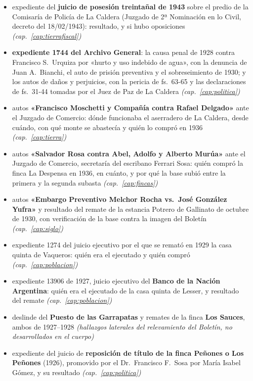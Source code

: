 \begin{itemize}[leftmargin=*]
\item expediente del \textbf{juicio de posesión treintañal de 1943} sobre el predio de la Comisaría de Policía de La Caldera (Juzgado de 2ª Nominación en lo Civil, decreto del 18/02/1943): resultado, y si hubo oposiciones \textit{(cap.\ \ref{cap:tierrafiscal})}
\item \textbf{expediente 1744 del Archivo General}: la causa penal de 1928 contra Francisco S.\ Urquiza por «hurto y uso indebido de agua», con la denuncia de Juan A.\ Bianchi, el auto de prisión preventiva y el sobreseimiento de 1930; y los autos de daños y perjuicios, con la pericia de fs.\ 63-65 y las declaraciones de fs.\ 31-44 tomadas por el Juez de Paz de La Caldera \textit{(cap.\ \ref{cap:politica})}
\item autos \textbf{«Francisco Moschetti y Compañía contra Rafael Delgado»} ante el Juzgado de Comercio: dónde funcionaba el aserradero de La Caldera, desde cuándo, con qué monte se abastecía y quién lo compró en 1936 \textit{(cap.\ \ref{cap:tierra})}
\item autos \textbf{«Salvador Rosa contra Abel, Adolfo y Alberto Murúa»} ante el Juzgado de Comercio, secretaría del escribano Ferrari Sosa: quién compró la finca La Despensa en 1936, en cuánto, y por qué la base subió entre la primera y la segunda subasta \textit{(cap.\ \ref{cap:fincas})}
\item autos \textbf{«Embargo Preventivo Melchor Rocha vs.\ José González Yufra»} y resultado del remate de la estancia Potrero de Gallinato de octubre de 1930, con verificación de la base contra la imagen del Boletín \textit{(cap.\ \ref{cap:siglo})}
\item expediente 1274 del juicio ejecutivo por el que se remató en 1929 la casa quinta de Vaqueros: quién era el ejecutado y quién compró \textit{(cap.\ \ref{cap:poblacion})}
\item expediente 13906 de 1927, juicio ejecutivo del \textbf{Banco de la Nación Argentina}: quién era el ejecutado de la casa quinta de Lesser, y resultado del remate \textit{(cap.\ \ref{cap:poblacion})}
\item deslinde del \textbf{Puesto de las Garrapatas} y remates de la finca \textbf{Los Sauces}, ambos de 1927--1928 \textit{(hallazgos laterales del relevamiento del Boletín, no desarrollados en el cuerpo)}
\item expediente del juicio de \textbf{reposición de título de la finca Peñones o Los Peñones} (1926), promovido por el Dr.\ Francisco F.\ Sosa por María Isabel Gómez, y su resultado \textit{(cap.\ \ref{cap:politica})}

\end{itemize}
